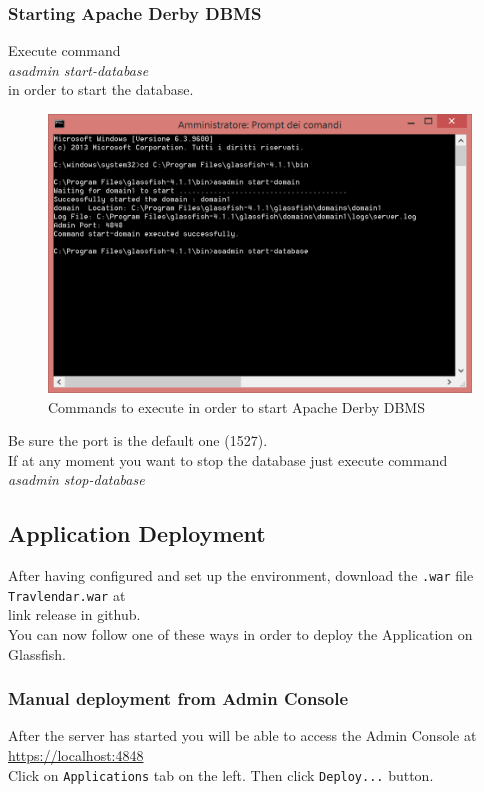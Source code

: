 \subsubsection{Starting Apache Derby DBMS}
Execute command \\
\textit{asadmin start-database} \\ in order to start the database. 
\begin{figure}[H]
\begin{center}
		\includegraphics[width=1.1\textwidth]{images/asadmindatabase}
		\caption{Commands to execute in order to start Apache Derby DBMS}
		
\end{center}
\end{figure}
Be sure the port is the default one (1527). \\
If at any moment you want to stop the database just execute command \\
\textit{asadmin stop-database}


\subsection{Application Deployment}
After having configured and set up the environment, download the \texttt{.war} file \texttt{Travlendar.war} at \\
link release in github.
\\You can now follow one of these ways in order to deploy the Application on Glassfish.

\subsubsection{Manual deployment from Admin Console}
After the server has started you will be able to access the Admin Console at  \\
\href{url}{https://localhost:4848}
\\Click on \texttt{Applications} tab on the left. Then click \texttt{Deploy...} button.

